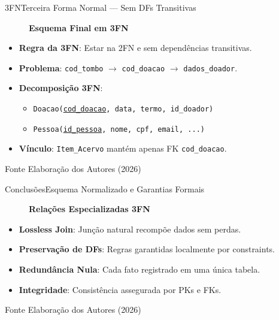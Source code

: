 \documentclass[10pt,aspectratio=169]{beamer}
\begin{document}
\begin{frame}{3FN}{Terceira Forma Normal --- Sem DFs Transitivas}
  \begin{figure}
    \centering
    \textbf{Esquema Final em 3FN}
  \end{figure}
  \vspace{0.3cm}
  \begin{itemize}
    \item \textbf{Regra da 3FN}: Estar na 2FN e sem dependências transitivas.
    \item \textbf{Problema}: \texttt{cod\_tombo} $\to$ \texttt{cod\_doacao} $\to$ \texttt{dados\_doador}.
    \item \textbf{Decomposição 3FN}:
    \begin{itemize}
      \item \texttt{Doacao(\underline{cod\_doacao}, data, termo, id\_doador)}
      \item \texttt{Pessoa(\underline{id\_pessoa}, nome, cpf, email, ...)}
    \end{itemize}
    \item \textbf{Vínculo}: \texttt{Item\_Acervo} mantém apenas FK \texttt{cod\_doacao}.
  \end{itemize}
  \vspace{0.2cm}
  \begin{block}{Fonte}
    Elaboração dos Autores (2026)
  \end{block}
\end{frame}

\begin{frame}{Conclusões}{Esquema Normalizado e Garantias Formais}
  \begin{figure}
    \centering
    \textbf{Relações Especializadas 3FN}
  \end{figure}
  \vspace{0.3cm}
  \begin{itemize}
    \item \textbf{Lossless Join}: Junção natural recompõe dados sem perdas.
    \item \textbf{Preservação de DFs}: Regras garantidas localmente por constraints.
    \item \textbf{Redundância Nula}: Cada fato registrado em uma única tabela.
    \item \textbf{Integridade}: Consistência assegurada por PKs e FKs.
  \end{itemize}
  \vspace{0.2cm}
  \begin{block}{Fonte}
    Elaboração dos Autores (2026)
  \end{block}
\end{frame}
\end{document}
